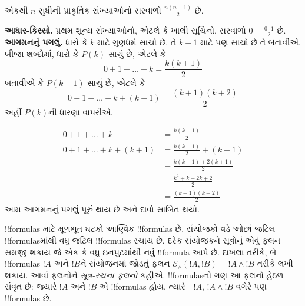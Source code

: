 \documentclass[../../../include/open-logic-section]{subfiles}
\begin{document}
\begin{ex}
એકથી $n$ સુધીની પ્રાકૃતિક સંખ્યાઓનો સરવાળો
$\frac{n(n+1)}{2}$ છે. \\

\textbf{આધાર-કિસ્સો.} પ્રથમ શૂન્ય સંખ્યાઓનો, એટલે કે ખાલી
સૂચિનો, સરવાળો $0=
\frac{0\cdot 1}{2}$ છે.\\

\textbf{આગમનનું પગલું.} ધારો કે $k$ માટે ગુણધર્મ સાચો છે.
તે $k+1$ માટે પણ સાચો છે તે બતાવીએ.
બીજા શબ્દોમાં, ધારો કે $P(k)$ સાચું છે, એટલે કે
\[ 0 + 1 + \ldots + k = \frac{k(k+1)}{2} \]
બતાવીએ કે $P(k+1)$ સાચું છે, એટલે કે
\[ 0 + 1 + \ldots + k + (k+1) = \frac{(k+1)(k+2)}{2} \]
અહીં $P(k)$ની ધારણા વાપરીએ.

\begin{align*}
0 + 1 + \ldots + k &= \frac{k(k+1)}{2} \tag{ધારણા} \\
0 + 1 + \ldots + k + (k+1) &= \frac{k(k+1)}{2} + (k+1)
\tag{બંને બાજુએ $k+1$ ઉમેરો} \\
&= \frac{k(k+1) + 2(k+1)}{2} \\
&= \frac{k^2 + k + 2k +2}{2} \\
&=\frac{(k+1)(k+2)}{2}
\end{align*}
આમ આગમનનું પગલું પૂરું થાય છે અને દાવો સાબિત થયો.
\end{ex}

\begin{explain}
!!{formula}s માટે મૂળભૂત ઘટકો આણ્વિક !!{formula}s છે.
સંયોજકો વડે ઓછાં જટિલ !!{formula}sમાંથી વધુ જટિલ
!!{formula}s રચાય છે. દરેક સંયોજકને સૂત્રોનું
એવું ફલન સમજી શકાય જે એક કે વધુ ઇનપુટમાંથી નવું
!!{formula} આપે છે. દાખલા તરીકે, બે !!{formula}s
$!A$ અને $!B$ને સંયોજનમાં જોડતું ફલન
$\mathcal E _\land (!A,
!B) = !A \land !B$ તરીકે લખી શકાય.
આવાં ફલનોને \emph{સૂત્ર-રચના ફલનો} કહીએ.
!!{formula}sનો ગણ આ ફલનો હેઠળ સંવૃત છે:
જ્યારે $!A$ અને $!B$ એ !!{formula}s હોય, ત્યારે
$\lnot !A$, $!A \land !B$ વગેરે પણ !!{formula}s છે.
\end{explain}
\end{document}
